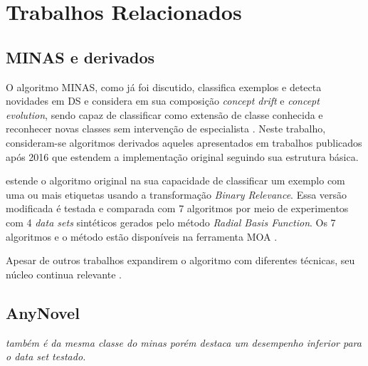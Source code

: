 \chapter{Trabalhos Relacionados}
\label{cha:related}



\section{MINAS e derivados}

O algoritmo MINAS, como já foi discutido, classifica exemplos e detecta
novidades em DS e considera em sua composição \emph{concept drift} e
\emph{concept evolution}, sendo capaz de classificar como extensão de classe
conhecida e reconhecer novas classes sem intervenção de especialista
\cite{Faria2016minas}. Neste trabalho, consideram-se algoritmos derivados
aqueles apresentados em trabalhos publicados após 2016 que estendem a
implementação original seguindo sua estrutura básica.




 estende o algoritmo original na sua capacidade de
classificar um exemplo com uma ou mais etiquetas usando a transformação
\emph{Binary Relevance}. Essa versão modificada é testada e comparada com 7
algoritmos por meio de experimentos com 4 \emph{data sets} sintéticos gerados
pelo método \emph{Radial Basis Function}. Os 7 algoritmos e o método estão
disponíveis na ferramenta MOA \cite{MOA}.


Apesar de outros trabalhos expandirem o algoritmo com diferentes técnicas, seu
núcleo continua relevante \cite{DaSilva2018,DaSilva2018thesis,Costa2019}.

\section{AnyNovel}

\textit{também é da mesma classe do minas porém  destaca um
desempenho inferior para o \emph{data set} testado.}

